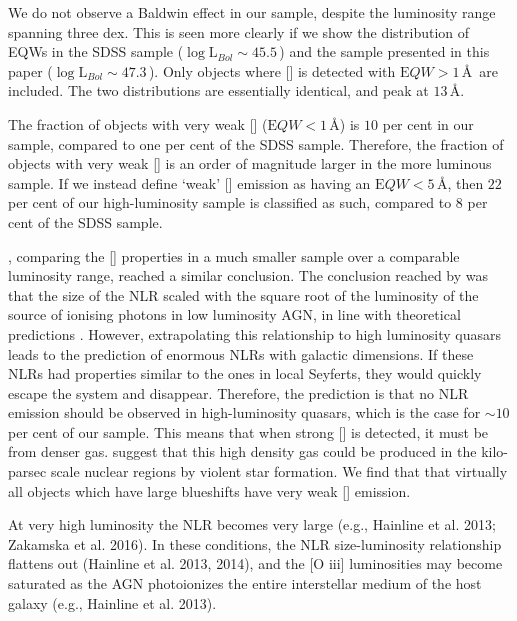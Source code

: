 We do not observe a Baldwin effect in our sample, despite the luminosity range spanning three dex. 
This is seen more clearly if we show the distribution of EQWs in the SDSS sample ($\log{\mathrm L_{Bol}} \sim 45.5$\,\ergs) and the sample presented in this paper ($\log{\mathrm L_{Bol}} \sim 47.3$\,\ergs).
Only objects where [] is detected with ${\mathrm EQW} > 1$\,\AA\, are included.
The two distributions are essentially identical, and peak at $13$\,\AA. 

The fraction of objects with very weak [] (${\mathrm EQW} < 1$\,\AA) is $10$ per cent in our sample, compared to one per cent of the SDSS sample. 
Therefore, the fraction of objects with very weak [] is an order of magnitude larger in the more luminous sample. 
If we instead define `weak' [] emission as having an ${\mathrm EQW} < 5$\,\AA, then $22$ per cent of our high-luminosity sample is classified as such, compared to $8$ per cent of the SDSS sample. 

\citet{netzer04}, comparing the [] properties in a much smaller sample over a comparable luminosity range, reached a similar conclusion. 
The conclusion reached by \citet{netzer04} was that the size of the NLR scaled with the square root of the luminosity of the source of ionising photons in low luminosity AGN, in line with theoretical predictions \citep[e.g.][]{netzer90}. 
However, extrapolating this relationship to high luminosity quasars leads to the prediction of enormous NLRs with galactic dimensions. 
If these NLRs had properties similar to the ones in local Seyferts, they would quickly escape the system and disappear. 
Therefore, the prediction is that no NLR emission should be observed in high-luminosity quasars, which is the case for $\sim10$ per cent of our sample. 
This means that when strong [] is detected, it must be from denser gas. 
\citet{netzer04} suggest that this high density gas could be produced in the kilo-parsec scale nuclear regions by violent star formation.  
We find that that virtually all objects which have large  blueshifts have very weak [] emission. 

At very high luminosity the NLR becomes very large (e.g., Hainline et al. 2013; Zakamska et al. 2016). 
In these conditions, the NLR size-luminosity relationship flattens out (Hainline et al. 2013, 2014), and the [O iii] luminosities may become saturated as the AGN photoionizes the entire interstellar medium of the host galaxy (e.g., Hainline et al. 2013). 
 
